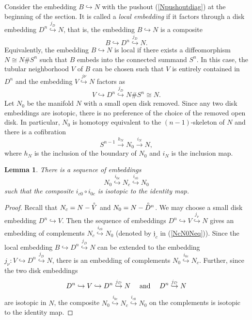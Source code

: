 \documentclass[a4]{amsart}
\newtheorem{lemma}[theorem]{Lemma}
\theoremstyle{definition}
\begin{document}
\begin{sloppypar}
Consider the embedding $B\stackrel{}{\hookrightarrow}N$ with the pushout (\ref{Npushoutdiag}) at the beginning of the section. It is called a {\it local embedding} if it factors through a disk embedding $D^n\stackrel{j_D}{\hookrightarrow} N$, that is, the embedding $B\stackrel{}{\hookrightarrow}N$ is a composite 
\[
B\stackrel{}{\hookrightarrow}D^n\stackrel{j_D}{\hookrightarrow} N.
\] 
Equivalently, the embedding $B\stackrel{}{\hookrightarrow}N$ is local if there exists a diffeomorphism $N\cong N\# S^n$ such that $B$ embeds into the connected summand $S^n$. 
In this case, the tubular neighborhood $V$ of $B$ can be chosen such that $V$ is entirely contained in $D^n$ and the embedding $V\stackrel{j\nu}{\hookrightarrow} N$ factors as
\[
V\stackrel{}{\hookrightarrow} D^n\stackrel{j_D}{\hookrightarrow} N\# S^n\cong N.
\]
Let $N_0$ be the manifold $N$ with a small open disk removed. Since any two disk embeddings are isotopic, there is no preference of the choice of the removed open disk. 
In particular, $N_0$ is homotopy equivalent to the $(n-1)$-skeleton of $N$ and there is a cofibration
\[
S^{n-1}\stackrel{h_N}{\longrightarrow} N_0\stackrel{i_N}{\longrightarrow} N,
\]
where $h_N$ is the inclusion of the boundary of $N_0$ and $i_N$ is the inclusion map. 
\begin{lemma}\label{localemblemma}
There is a sequence of embeddings 
\[
N_0\stackrel{i_{0c}}{\hookrightarrow} N_c \stackrel{i_{c0}}{\hookrightarrow} N_0
\]
such that the composite $i_{c0}\circ i_{0c}$ is isotopic to the identity map.
\end{lemma}
\begin{proof}
Recall that $N_c= N- \accentset{\circ}{V}$ and $N_0=N-\accentset{\circ}{D}^{n}$. We may choose a small disk embedding $D^n\stackrel{}{\hookrightarrow} V$. Then the sequence of embeddings $D^n\stackrel{}{\hookrightarrow} V\stackrel{j_\nu}{\hookrightarrow} N$ gives an embedding of complements $N_c \stackrel{i_{c0}}{\hookrightarrow} N_0$ (denoted by $\mathfrak{j}_c$ in (\ref{NcN0Neq})). 
Since the local embedding $B\hookrightarrow D^n\stackrel{j_D}{\hookrightarrow} N$ can be extended to the embedding $j_\nu: V\hookrightarrow D^n\stackrel{j_D}{\hookrightarrow} N$, there is an embedding of complements $N_0\stackrel{i_{0c}}{\hookrightarrow} N_c$. Further, since the two disk embeddings 
\[
D^n\stackrel{}{\hookrightarrow} V\hookrightarrow D^n\stackrel{j_D}{\hookrightarrow} N \ \ \ ~{\rm and}~\ \ \  D^n\stackrel{j_D}{\hookrightarrow} N
\] 
are isotopic in $N$, the composite $N_0\stackrel{i_{0c}}{\hookrightarrow} N_c \stackrel{i_{c0}}{\hookrightarrow} N_0$ on the complements is isotopic to the identity map. 
\end{proof}


\end{sloppypar}
\end{document}
